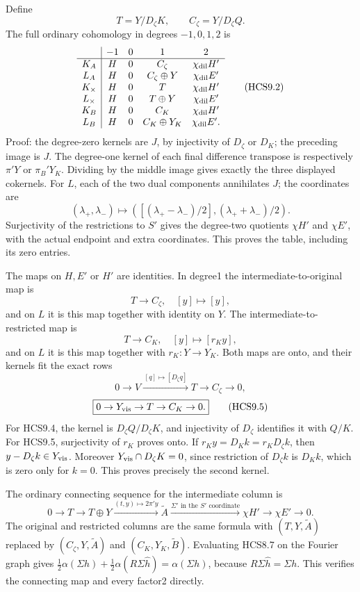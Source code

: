 Define \[
T=Y/D_\zeta K,\qquad C_\zeta=Y/D_\zeta Q.
\tag{HCS9.1}
\] The full ordinary cohomology in degrees \(-1,0,1,2\) is \[
\begin{array}{c|cccc}
&-1&0&1&2\\ \hline
K_A&H&0&C_\zeta&\chi_{\rm dil}H'\\
L_A&H&0&C_\zeta\oplus Y&\chi_{\rm dil}E'\\
K_\times&H&0&T&\chi_{\rm dil}H'\\
L_\times&H&0&T\oplus Y&\chi_{\rm dil}E'\\
K_B&H&0&C_K&\chi_{\rm dil}H'\\
L_B&H&0&C_K\oplus Y_K&\chi_{\rm dil}E'.
\end{array}
\tag{HCS9.2}
\] Proof: the degree-zero kernels are \(J\), by injectivity of
\(D_\zeta\) or \(D_K\); the preceding image is \(J\). The degree-one
kernel of each final difference transpose is respectively \(\pi'Y\) or
\(\pi_B'Y_K\). Dividing by the middle image gives exactly the three
displayed cokernels. For \(L\), each of the two dual components
annihilates \(J\); the coordinates are \[
(\lambda_+,\lambda_-)\longmapsto
\left(\left[(\lambda_+-\lambda_-)/2\right],
(\lambda_++\lambda_-)/2\right).
\tag{HCS9.3}
\] Surjectivity of the restrictions to \(S'\) gives the degree-two
quotients \(\chi H'\) and \(\chi E'\), with the actual endpoint and
extra coordinates. This proves the table, including its zero entries.

The maps on \(H,E'\) or \(H'\) are identities. In degree1 the
intermediate-to-original map is \[
T\to C_\zeta,\quad[y]\mapsto[y],
\] and on \(L\) it is this map together with identity on \(Y\). The
intermediate-to-restricted map is \[
T\to C_K,\quad[y]\mapsto[r_Ky],
\] and on \(L\) it is this map together with \(r_K:Y\to Y_K\). Both maps
are onto, and their kernels fit the exact rows \[
\boxed{0\to V\xrightarrow{\,[q]\mapsto[D_\zeta q]\,}
T\to C_\zeta\to0,}
\tag{HCS9.4}
\] \[
\boxed{0\to Y_{\rm vis}\to T\to C_K\to0.}
\tag{HCS9.5}
\] For HCS9.4, the kernel is \(D_\zeta Q/D_\zeta K\), and injectivity of
\(D_\zeta\) identifies it with \(Q/K\). For HCS9.5, surjectivity of
\(r_K\) proves onto. If \(r_Ky=D_Kk=r_KD_\zeta k\), then
\(y-D_\zeta k\in Y_{\rm vis}\). Moreover
\(Y_{\rm vis}\cap D_\zeta K=0\), since restriction of \(D_\zeta k\) is
\(D_Kk\), which is zero only for \(k=0\). This proves precisely the
second kernel.

The ordinary connecting sequence for the intermediate column is \[
0\to T\to T\oplus Y
\xrightarrow{(t,y)\mapsto2\pi'y}\widetilde A
\xrightarrow{\Sigma'\text{ in the }S'\text{ coordinate}}
\chi H'\to\chi E'\to0.
\tag{HCS9.6}
\] The original and restricted columns are the same formula with
\((T,Y,\widetilde A)\) replaced by \((C_\zeta,Y,\widetilde A)\) and
\((C_K,Y_K,\widetilde B)\). Evaluating HCS8.7 on the Fourier graph gives
\(\tfrac12\alpha(\Sigma h)+\tfrac12\alpha(R\Sigma\widehat h)
=\alpha(\Sigma h)\), because \(R\Sigma\widehat h=\Sigma h\). This
verifies the connecting map and every factor2 directly.


